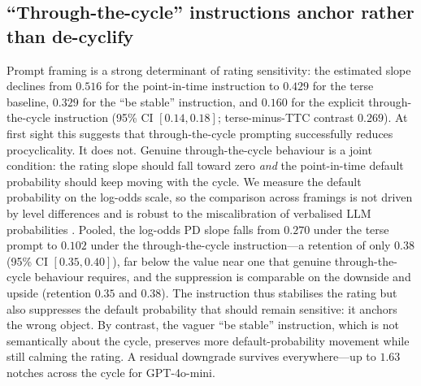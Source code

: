 \documentclass[a4paper,fleqn]{cas-sc}
\begin{document}
\subsection{``Through-the-cycle'' instructions anchor rather than de-cyclify}\label{sec:ttc}
Prompt framing is a strong determinant of rating sensitivity: the estimated slope declines from
$0.516$ for the point-in-time instruction to $0.429$ for the terse baseline, $0.329$ for the ``be
stable'' instruction, and $0.160$ for the explicit through-the-cycle instruction (95\% CI
$[0.14,0.18]$; terse-minus-TTC contrast $0.269$). At first sight this suggests that through-the-cycle
prompting successfully reduces procyclicality. It does not. Genuine through-the-cycle behaviour is a
joint condition: the rating slope should fall toward zero \emph{and} the point-in-time default
probability should keep moving with the cycle. We measure the default probability on the log-odds
scale, so the comparison across framings is not driven by level differences and is robust to the
miscalibration of verbalised LLM probabilities \citep{kadavath2022,kang2023}. Pooled, the log-odds PD
slope falls from $0.270$ under the terse prompt to $0.102$ under the through-the-cycle
instruction---a retention of only $0.38$ (95\% CI $[0.35,0.40]$), far below the value near one that
genuine through-the-cycle behaviour requires, and the suppression is comparable on the downside and
upside (retention $0.35$ and $0.38$). The instruction thus stabilises the rating but also suppresses
the default probability that should remain sensitive: it anchors the wrong object. By contrast, the
vaguer ``be stable'' instruction, which is not semantically about the cycle, preserves more
default-probability movement while still calming the rating. A residual downgrade survives
everywhere---up to $1.63$ notches across the cycle for GPT-4o-mini.
\end{document}
